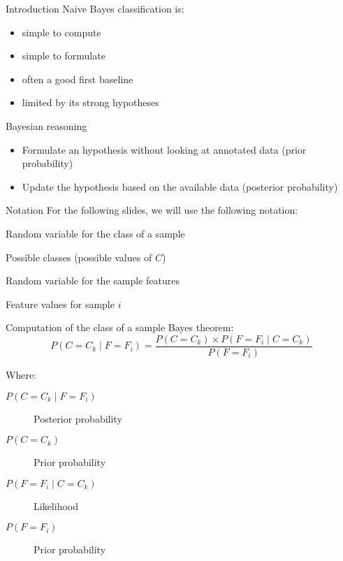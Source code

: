 \begin{frame}{Introduction}
  Naive Bayes classification is:
  \begin{itemize}[<+(1)->]
    \item simple to compute
    \item simple to formulate
    \item often a good first baseline
    \item limited by its strong hypotheses
  \end{itemize}
\end{frame}

\begin{frame}{Bayesian reasoning}
  \begin{itemize}
    \item Formulate an hypothesis without looking at annotated data (prior probability)
    \item Update the hypothesis based on the available data (posterior probability)
  \end{itemize}
\end{frame}

\begin{frame}{Notation}
  For the following slides, we will use the following notation:

  \begin{description}[<+(1)->]
    \item[$C$] Random variable for the class of a sample
    \item[$C_k$] Possible classes (possible values of $C$)
    \item[$F$] Random variable for the sample features
    \item[$F_i$] Feature values for sample $i$
  \end{description}
\end{frame}

\begin{frame}{Computation of the class of a sample}
  Bayes theorem:
  \[
    P(C = C_k \mid F = F_i) = \frac{P(C = C_k) \times P(F = F_i \mid C = C_k)}{P(F = F_i)}
  \]

  Where:

  \begin{description}
    \item[$P(C = C_k \mid F = F_i)$] Posterior probability
    \item[$P(C = C_k)$] Prior probability
    \item[$P(F = F_i \mid C = C_k)$] Likelihood
    \item[$P(F = F_i)$] Prior probability
  \end{description}
\end{frame}

